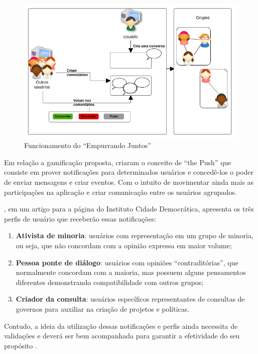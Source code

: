   \begin{figure}[h!]
  \centering
  \includegraphics[scale=0.7]{figuras/resumo_ej.png}
  \caption{Funcionamento do ``Empurrando Juntos''}
  \label{fig:resumo_ej}
  \end{figure}

  Em relação a gamificação proposta,  criaram o conceito de ``the Push'' que consiste
  em prover notificações para determinados usuários e concedê-los o poder de enviar mensagens e criar eventos. Com 
  o intuito de movimentar ainda mais as participações na aplicação e criar comunicação entre os usuários agrupados.

  , em um artigo para a página do Instituto Cidade Democrática, apresenta os três perfis de usuário
  que receberão essas notificações:

  \begin{enumerate}
    \item \textbf{Ativista de minoria}: usuários com representação em um grupo de minoria, ou seja, que não concordam com a opinião 
      expressa em maior volume;
    \item \textbf{Pessoa ponte de diálogo}: usuários com opiniões ``contraditórias'', que normalmente concordam com a maioria, mas
      possuem alguns pensamentos diferentes demonstrando compatibilidade com outros grupos;
    \item \textbf{Criador da consulta}: usuários específicos representantes de consultas de governos para auxiliar na criação de projetos
    e políticas.
  \end{enumerate}


  Contudo, a ideia da utilização dessas notificações e perfis ainda necessita de validações e deverá ser bem
  acompanhada para garantir a efetividade do seu propósito \cite{empurrandojuntos, parra}. 

